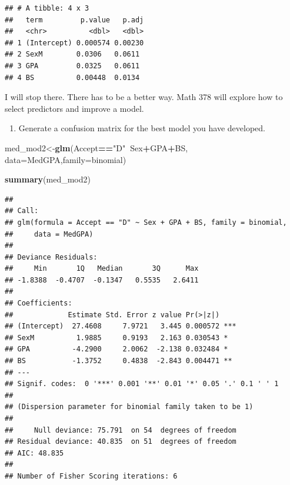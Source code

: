 \documentclass[
]{book}
\newenvironment{Shaded}{\begin{snugshade}}{\end{snugshade}}
\newcommand{\DataTypeTok}[1]{\textcolor[rgb]{0.13,0.29,0.53}{#1}}
\newcommand{\KeywordTok}[1]{\textcolor[rgb]{0.13,0.29,0.53}{\textbf{#1}}}
\newcommand{\NormalTok}[1]{#1}
\newcommand{\OperatorTok}[1]{\textcolor[rgb]{0.81,0.36,0.00}{\textbf{#1}}}
\newcommand{\StringTok}[1]{\textcolor[rgb]{0.31,0.60,0.02}{#1}}
\providecommand{\tightlist}{%
  \setlength{\itemsep}{0pt}\setlength{\parskip}{0pt}}
\begin{document}
\begin{verbatim}
## # A tibble: 4 x 3
##   term         p.value   p.adj
##   <chr>          <dbl>   <dbl>
## 1 (Intercept) 0.000574 0.00230
## 2 SexM        0.0306   0.0611 
## 3 GPA         0.0325   0.0611 
## 4 BS          0.00448  0.0134
\end{verbatim}

I will stop there. There has to be a better way. Math 378 will explore how to select predictors and improve a model.

\begin{enumerate}
\def\labelenumi{\alph{enumi}.}
\setcounter{enumi}{5}
\tightlist
\item
  Generate a confusion matrix for the best model you have developed.
\end{enumerate}

\begin{Shaded}
\begin{Highlighting}[]
\NormalTok{med_mod2<-}\KeywordTok{glm}\NormalTok{(Accept}\OperatorTok{==}\StringTok{"D"}\OperatorTok{~}\NormalTok{Sex}\OperatorTok{+}\NormalTok{GPA}\OperatorTok{+}\NormalTok{BS,}
         \DataTypeTok{data=}\NormalTok{MedGPA,}\DataTypeTok{family=}\NormalTok{binomial)}
\end{Highlighting}
\end{Shaded}

\begin{Shaded}
\begin{Highlighting}[]
\KeywordTok{summary}\NormalTok{(med_mod2)}
\end{Highlighting}
\end{Shaded}

\begin{verbatim}
## 
## Call:
## glm(formula = Accept == "D" ~ Sex + GPA + BS, family = binomial, 
##     data = MedGPA)
## 
## Deviance Residuals: 
##     Min       1Q   Median       3Q      Max  
## -1.8388  -0.4707  -0.1347   0.5535   2.6411  
## 
## Coefficients:
##             Estimate Std. Error z value Pr(>|z|)    
## (Intercept)  27.4608     7.9721   3.445 0.000572 ***
## SexM          1.9885     0.9193   2.163 0.030543 *  
## GPA          -4.2900     2.0062  -2.138 0.032484 *  
## BS           -1.3752     0.4838  -2.843 0.004471 ** 
## ---
## Signif. codes:  0 '***' 0.001 '**' 0.01 '*' 0.05 '.' 0.1 ' ' 1
## 
## (Dispersion parameter for binomial family taken to be 1)
## 
##     Null deviance: 75.791  on 54  degrees of freedom
## Residual deviance: 40.835  on 51  degrees of freedom
## AIC: 48.835
## 
## Number of Fisher Scoring iterations: 6
\end{verbatim}
\end{document}

